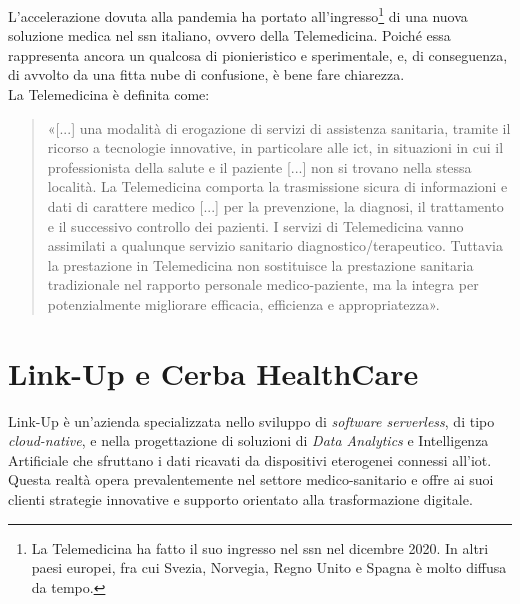 L'accelerazione dovuta alla pandemia ha portato all'ingresso\footnote{La Telemedicina ha fatto il suo ingresso nel \acrshort{ssn} nel dicembre 2020. In altri paesi europei, fra cui Svezia, Norvegia, Regno Unito e Spagna è molto diffusa da tempo.} di una nuova soluzione medica nel \acrfull{ssn} italiano, ovvero della Telemedicina. Poiché essa rappresenta ancora un qualcosa di pionieristico e sperimentale, e, di conseguenza, di avvolto da una fitta nube di confusione, è bene fare chiarezza.\\
La Telemedicina è definita come:
\begin{quote}
  «[...] una modalità di erogazione di servizi di assistenza sanitaria, tramite il ricorso a tecnologie innovative, in particolare alle \acrfull{ict}, in situazioni in cui il professionista della salute e il paziente [...] non si trovano nella stessa località. La Telemedicina comporta la trasmissione sicura di informazioni e dati di carattere medico [...] per la prevenzione, la diagnosi, il trattamento e il successivo controllo dei pazienti. I servizi di Telemedicina vanno assimilati a qualunque servizio sanitario diagnostico/terapeutico. Tuttavia la prestazione in Telemedicina non sostituisce la prestazione sanitaria tradizionale nel rapporto personale medico-paziente, ma la integra per potenzialmente migliorare efficacia, efficienza e appropriatezza»\cite{Stato_Telemedicina}.
\end{quote}


\section{Link-Up e Cerba HealthCare}
Link-Up è un'azienda specializzata nello sviluppo di \textit{software serverless}, di tipo \textit{cloud-native}, e nella progettazione di soluzioni di \textit{Data Analytics} e Intelligenza Artificiale che sfruttano i dati ricavati da dispositivi eterogenei connessi all'\gls{iot}.
\\
Questa realtà opera prevalentemente nel settore medico-sanitario e offre ai suoi clienti strategie innovative e supporto orientato alla trasformazione digitale.

